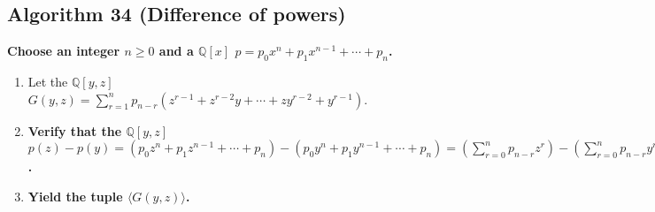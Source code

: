 \documentclass[twocolumn]{article}
\begin{document}
		\subsection{Algorithm 34 (Difference of powers)}\label{sec:algorithm 34}
			\textbf{Choose an integer $n\ge 0$ and a $\mathbb{Q}[x]$ $p=p_0x^n+p_1x^{n-1}+\cdots+p_n$.}
			\begin{enumerate}
				\item Let the $\mathbb{Q}[y,z]$ $G(y,z)=\sum_{r=1}^n p_{n-r}(z^{r-1}+z^{r-2}y+\cdots+zy^{r-2}+y^{r-1})$.
				\item \textbf{Verify that the $\mathbb{Q}[y,z]$ $p(z)-p(y)=(p_0z^n+p_1z^{n-1}+\cdots+p_n)-(p_0y^n+p_1y^{n-1}+\cdots+p_n)=(\sum_{r=0}^n p_{n-r}z^r)-(\sum_{r=0}^n p_{n-r}y^r)=\sum_{r=1}^n p_{n-r}(z^r-y^r)=\sum_{r=1}^n p_{n-r}(z-y)(z^{r-1}+z^{r-2}y+\cdots+zy^{r-2}+y^{r-1})=(z-y)\sum_{r=1}^n p_{n-r}(z^{r-1}+z^{r-2}y+\cdots+zy^{r-2}+y^{r-1})=(z-y)G(y,z)$.}
				\item \textbf{Yield the tuple $\langle G(y,z)\rangle$.}
			\end{enumerate}
\end{document}
